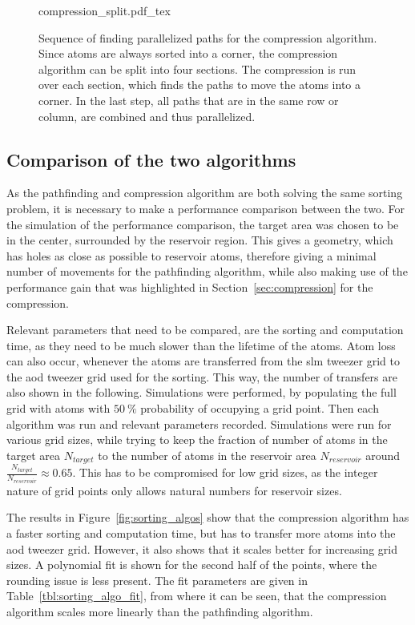 \begin{figure}[tbp]%
\centering
{compression_split.pdf_tex}
\caption{Sequence of finding parallelized paths for the compression algorithm. Since atoms are always sorted into a corner, the compression algorithm can be split into four sections. The compression is run over each section, which finds the paths to move the atoms into a corner. In the last step, all paths that are in the same row or column, are combined and thus parallelized.}%
\label{fig:compression_split}
\end{figure}

\subsection{Comparison of the two algorithms}

As the pathfinding and compression algorithm are both solving the same sorting problem, it is necessary to make a performance comparison between the two. For the simulation of the performance comparison, the target area was chosen to be in the center, surrounded by the reservoir region. This gives a geometry, which has holes as close as possible to reservoir atoms, therefore giving a minimal number of movements for the pathfinding algorithm, while also making use of the performance gain that was highlighted in Section~\ref{sec:compression} for the compression.

Relevant parameters that need to be compared, are the sorting and computation time, as they need to be much slower than the lifetime of the atoms. Atom loss can also occur, whenever the atoms are transferred from the \ac{slm} tweezer grid to the \ac{aod} tweezer grid used for the sorting. This way, the number of transfers are also shown in the following.
Simulations were performed, by populating the full grid with atoms with $\SI{50}{\percent}$ probability of occupying a grid point. Then each algorithm was run and relevant parameters recorded. Simulations were run for various grid sizes, while trying to keep the fraction of number of atoms in the target area $N_{target}$ to the number of atoms in the reservoir area $N_{reservoir}$ around $\frac{N_{target}}{N_{reservoir}} \approx 0.65$. This has to be compromised for low grid sizes, as the integer nature of grid points only allows natural numbers for reservoir sizes.

The results in Figure~\ref{fig:sorting_algos} show that the compression algorithm has a faster sorting and computation time, but has to transfer more atoms into the \ac{aod} tweezer grid. However, it also shows that it scales better for increasing grid sizes. A polynomial fit is shown for the second half of the points, where the rounding issue is less present. The fit parameters are given in Table~\ref{tbl:sorting_algo_fit}, from where it can be seen, that the compression algorithm scales more linearly than the pathfinding algorithm.

